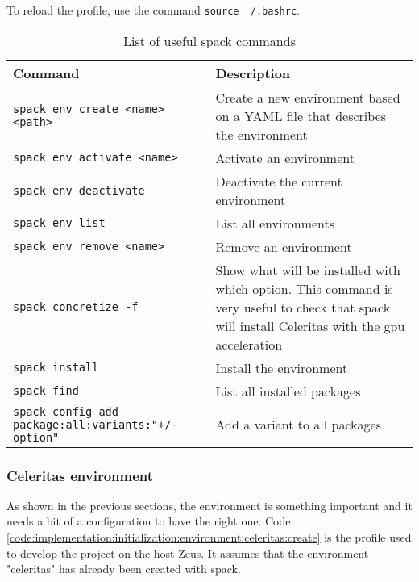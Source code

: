 To reload the profile, use the command \texttt{source ~/.bashrc}.

\begin{table}[ht]
    \centering
    \begin{tabular}{|m{}|m{}|}
        \hline
        \textbf{Command} & \textbf{Description} \\
        \hline
        \texttt{spack env create <name> <path>} & Create a new environment based
            on a YAML file that describes the environment \\
        \hline
        \texttt{spack env activate <name>} & Activate an environment \\
        \hline
        \texttt{spack env deactivate} & Deactivate the current environment \\
        \hline
        \texttt{spack env list} & List all environments \\
        \hline
        \texttt{spack env remove <name>} & Remove an environment \\
        \hline
        \texttt{spack concretize -f} & Show what will be installed with which option.
            This command is very useful to check that spack will install
            Celeritas with the \acrshort{gpu} acceleration \\
        \hline
        \texttt{spack install} & Install the environment \\
        \hline
        \texttt{spack find} & List all installed packages \\
        \hline
        \texttt{spack config add package:all:variants:"+/-option"} & Add a variant to all packages \\
        \hline
    \end{tabular}
    \caption{List of useful spack commands}
    \label{tab:implementation:initialization:environment:spack:commands}
\end{table}


\subsubsection{Celeritas environment}
\label{ch:implementation:initialization:environment:celeritas}

As shown in the previous sections, the environment is something important and
it needs a bit of a configuration to have the right one.
Code \ref{code:implementation:initialization:environment:celeritas:create} is
the profile used to develop the project on the host Zeus.
It assumes that the environment "celeritas" has already been created with spack.

